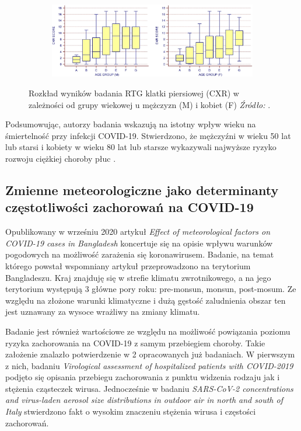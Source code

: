 \documentclass[polish, twoside, 12pt, a4paper]{article}
\theoremstyle{definition}
\theoremstyle{plain}
\theoremstyle{remark}
\begin{document}
\begin{figure}[H]
  \centering
  \begin{subfigure}[t]{\textwidth}
    \includegraphics[width=15cm]{age-sex.jpg}
  \end{subfigure}
  \captionsetup{margin=10pt,font=small,labelfont=bf,width=.8\textwidth}
  \caption{Rozkład wyników badania RTG klatki piersiowej (CXR) w zależności od grupy wiekowej u mężczyzn (M) i kobiet (F) \textit{Źródło:} \cite{wang2020}.}\label{fig:xxx2}
\end{figure}

Podsumowując, autorzy badania wskazują na istotny wpływ wieku na śmiertelność przy infekcji COVID-19. Stwierdzono, że mężczyźni w wieku 50 lat lub starsi i kobiety w wieku 80 lat lub starsze wykazywali najwyższe ryzyko rozwoju ciężkiej choroby płuc \citep{wang2020}.

\subsection{Zmienne meteorologiczne jako determinanty częstotliwości zachorowań na COVID-19}


Opublikowany w wrześniu 2020 artykuł \emph{Effect of meteorological factors on COVID-19 cases in Bangladesh} \citep{hasanuzzaman2020} koncertuje się na opisie wpływu warunków pogodowych na możliwość zarażenia się koronawirusem. Badanie, na temat którego powstał wspomniany artykuł przeprowadzono na terytorium Bangladeszu. Kraj znajduję się w strefie klimatu zwrotnikowego, a na jego terytorium występują 3 główne pory roku: pre-monsun, monsun, post-mosum. Ze względu na złożone warunki klimatyczne i dużą gęstość zaludnienia obszar ten jest uznawany za wysoce wrażliwy na zmiany klimatu.

Badanie jest również wartościowe ze względu na możliwość powiązania poziomu ryzyka zachorowania na COVID-19 z samym przebiegiem choroby. Takie założenie znalazło potwierdzenie w 2 opracowanych już badaniach. W pierwszym z nich,  badaniu \emph{Virological assessment of hospitalized patients with COVID-2019} \citep{wolfel2020} podjęto się opisania przebiegu zachorowania z punktu widzenia rodzaju jak i stężenia cząsteczek wirusa. Jednocześnie w badaniu \emph{SARS-CoV-2 concentrations and virus-laden aerosol size distributions in outdoor air in north and south of Italy} \citep{chirizzi2020} stwierdzono fakt o wysokim znaczeniu stężenia wirusa i częstości zachorowań.
\end{document}
